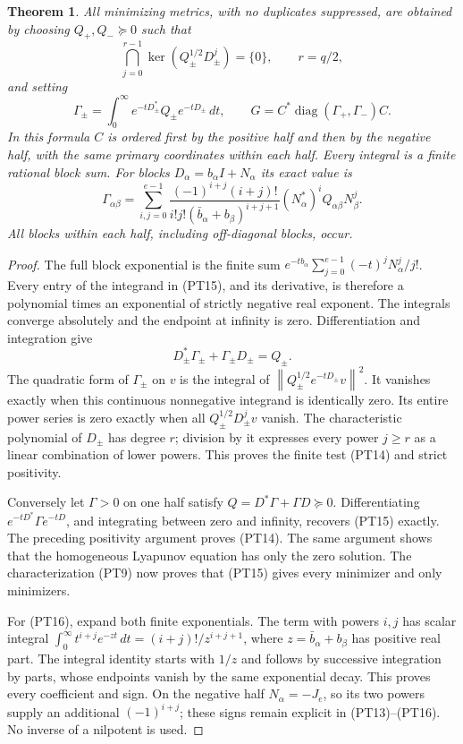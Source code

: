 \documentclass[11pt,a4paper]{article}
\newtheorem{theorem}{Theorem}[section]
\providecommand{\diag}{\operatorname{diag}}
\providecommand{\norm}[1]{\left\lVert#1\right\rVert}
\begin{document}
\begin{theorem}
All minimizing metrics, with no duplicates suppressed, are obtained
by choosing \(Q_+,Q_-\succeq0\) such that
\begin{equation}\tag{PT14}
 \bigcap_{j=0}^{r-1}\ker(Q_\pm^{1/2}D_\pm^j)=\{0\},
 \qquad r=q/2,
\end{equation}
and setting
\begin{equation}\tag{PT15}
 \Gamma_\pm=\int_0^\infty e^{-tD_\pm^*}Q_\pm e^{-tD_\pm}\,dt,
 \qquad G=C^*\diag(\Gamma_+,\Gamma_-)C.
\end{equation}
In this formula \(C\) is ordered first by the positive half and
then by the negative half, with the same primary coordinates
within each half. Every integral is a finite rational block sum.
For blocks \(D_\alpha=b_\alpha I+N_\alpha\) its exact value is
\begin{equation}\tag{PT16}
 \Gamma_{\alpha\beta}
 =\sum_{i,j=0}^{e-1}
 \frac{(-1)^{i+j}(i+j)!}
      {i!j!(\bar b_\alpha+b_\beta)^{i+j+1}}
 (N_\alpha^*)^i Q_{\alpha\beta}N_\beta^j.
\end{equation}
All blocks within each half, including off-diagonal blocks, occur.
\end{theorem}
\begin{proof}
The full block exponential is the finite sum
\(e^{-tb_\alpha}\sum_{j=0}^{e-1}(-t)^jN_\alpha^j/j!\).
Every entry of the integrand in (PT15), and its derivative, is
therefore a polynomial times an exponential of strictly negative
real exponent. The integrals converge absolutely and the endpoint
at infinity is zero. Differentiation and integration give
\[
 D_\pm^*\Gamma_\pm+\Gamma_\pm D_\pm=Q_\pm.
\]
The quadratic form of \(\Gamma_\pm\) on \(v\) is the integral
of \(\norm{Q_\pm^{1/2}e^{-tD_\pm}v}^2\). It vanishes
exactly when this continuous nonnegative integrand is identically
zero. Its entire power series is zero exactly when all
\(Q_\pm^{1/2}D_\pm^jv\) vanish. The characteristic polynomial
of \(D_\pm\) has degree \(r\); division by it expresses every
power \(j\ge r\) as a linear combination of lower powers.
This proves the finite test (PT14) and strict positivity.

Conversely let \(\Gamma>0\) on one half satisfy
\(Q=D^*\Gamma+\Gamma D\succeq0\). Differentiating
\(e^{-tD^*}\Gamma e^{-tD}\), and integrating between zero
and infinity, recovers (PT15) exactly. The preceding positivity
argument proves (PT14). The same argument shows that the
homogeneous Lyapunov equation has only the zero solution.
The characterization (PT9) now proves that (PT15) gives every
minimizer and only minimizers.

For (PT16), expand both finite exponentials. The term with powers
\(i,j\) has scalar integral
\(\int_0^\infty t^{i+j}e^{-zt}\,dt=(i+j)!/z^{i+j+1}\),
where \(z=\bar b_\alpha+b_\beta\) has positive real part.
The integral identity starts with \(1/z\) and follows by
successive integration by parts, whose endpoints vanish by the
same exponential decay. This proves every coefficient and sign.
On the negative half \(N_\alpha=-J_e\), so its two powers
supply an additional \((-1)^{i+j}\); these signs remain
explicit in (PT13)--(PT16). No inverse of a nilpotent is used.
\end{proof}
\end{document}
